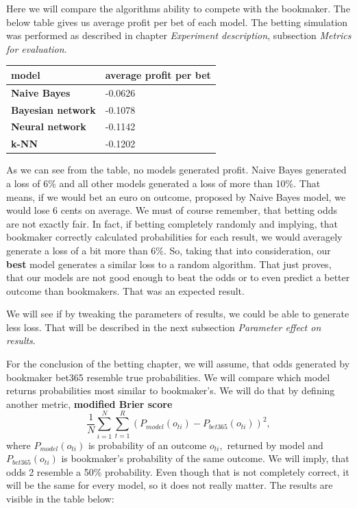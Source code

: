\documentclass[conference]{IEEEtran}
\begin{document}
Here we will compare the algorithms ability to compete with the bookmaker. The below table
gives us average profit per bet of each model. The betting simulation was performed as
described in chapter \textit{Experiment description}, subsection \textit{Metrics for
evaluation}.

\begin{table}[!ht]
    \centering
    \begin{tabular}{|l|l|}
    \hline
        \textbf{model} & average profit per bet \\ \hline
        \textbf{Naive Bayes} & -0.0626 \\ \hline
        \textbf{Bayesian network} & -0.1078 \\ \hline
        \textbf{Neural network} & -0.1142 \\ \hline
        \textbf{k-NN} & -0.1202 \\ \hline
    \end{tabular}
\end{table}

As we can see from the table, no models generated profit. Naive Bayes generated a loss of 6\%
and all other models generated a loss of more than 10\%. That means, if we would bet an euro 
on outcome, proposed by Naive Bayes model, we would lose 6 cents on average. We must of course
remember, that betting odds are not exactly fair. In fact, if betting completely 
randomly and implying, that bookmaker correctly calculated probabilities for each result, 
we would averagely generate a loss of a bit more than 6\%. So, taking that into consideration,
our \textbf{best} model generates a similar loss to a random algorithm. That just proves, that
our models are not good enough to beat the odds or to even predict a better outcome than
bookmakers. That was an expected result.

We will see if by tweaking the parameters of results, we could be able to generate less loss.
That will be described in the next subsection \textit{Parameter effect on results}.

For the conclusion of the betting chapter, we will assume, that odds generated by bookmaker
bet365 resemble true probabilities. We will compare which model returns probabilities most similar to
bookmaker's. We will do that by defining another metric, \textbf{modified Brier score}
$$\frac{1}{N} \sum_{i=1}^{N} \sum_{t=1}^{R} {(P_{model}(o_{ti}) - P_{bet365}(o_{ti}))^2},$$
where $P_{model}(o_{ti})$ is probability of an outcome $o_{ti},$ returned by model and 
$P_{bet365}(o_{ti})$ is bookmaker's probability of the same outcome. We will imply, that 
odds 2 resemble a 50\% probability. Even though that is not completely correct, it will be 
the same for every model, so it does not really matter. The results are visible in the table
below:
\end{document}
